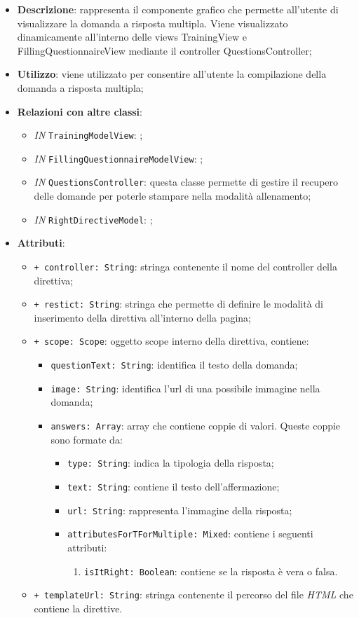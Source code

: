 		\begin{itemize}
			\item \textbf{Descrizione}: rappresenta il componente grafico che permette all'utente di visualizzare la domanda a risposta multipla. Viene visualizzato dinamicamente all'interno delle views TrainingView e FillingQuestionnaireView mediante il controller QuestionsController;
			\item \textbf{Utilizzo}: viene utilizzato per consentire all'utente la compilazione della domanda a risposta multipla;
			\item \textbf{Relazioni con altre classi}: 
			\begin{itemize}
				\item \textit{IN} \texttt{TrainingModelView}: ; 
				\item \textit{IN} \texttt{FillingQuestionnaireModelView}: ;
				\item \textit{IN} \texttt{QuestionsController}: questa classe permette di gestire il recupero delle domande per poterle stampare nella modalità allenamento;
				\item \textit{IN} \texttt{RightDirectiveModel}: ;
			\end{itemize}
			\item \textbf{Attributi}: 
			\begin{itemize}
				\item \texttt{+ controller: String}: stringa contenente il nome del controller della direttiva;
				\item \texttt{+ restict: String}: stringa che permette di definire le modalità di inserimento della direttiva all'interno della pagina;
				\item \texttt{+ scope: Scope}: oggetto scope interno della direttiva, contiene:
				\begin{itemize}
					\item \texttt{questionText: String}: identifica il testo della domanda;
					\item \texttt{image: String}: identifica l'url di una possibile immagine nella domanda;
					\item \texttt{answers: Array}: array che contiene coppie di valori. Queste coppie sono formate da:
					\begin{itemize}
						\item \texttt{type: String}: indica la tipologia della risposta;
						\item \texttt{text: String}: contiene il testo dell'affermazione;
						\item \texttt{url: String}: rappresenta l'immagine della risposta;
						\item \texttt{attributesForTForMultiple: Mixed}: contiene i seguenti attributi:
						\begin{enumerate}
							\item \texttt{isItRight: Boolean}: contiene se la risposta è vera o falsa.
						\end{enumerate}
					\end{itemize}
				\end{itemize}
				\item \texttt{+ templateUrl: String}: stringa contenente il percorso del file \textit{HTML} che contiene la direttive.
				

\end{itemize}
\end{itemize}
